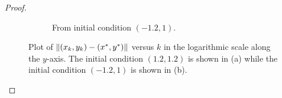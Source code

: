 \documentclass[12pt]{report}
\begin{document}
\begin{problem}
\begin{proof}
\begin{figure}[H]
\begin{subfigure}[b]{0.5\linewidth}
        \caption{From initial condition $(-1.2,1)$.}
        \label{fig3:b}
        \vspace{4ex}
    \end{subfigure}
    \caption{Plot of ${\left\|(x_k, y_k) - (x^*, y^*)\right\|}$ versus $k$ in the logarithmic scale along the $y$-axis. The initial condition $(1.2,1.2)$ is shown in (a) while the initial condition $(-1.2,1)$ is shown in (b).}
    \label{fig3}
\end{figure}


\end{proof}
\end{problem}
\end{document}
